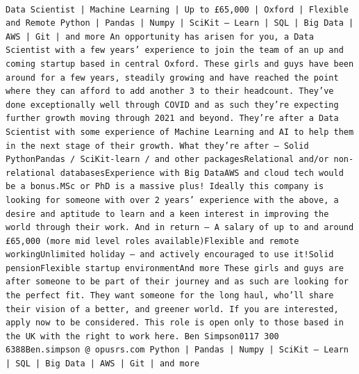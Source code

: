 \documentclass[
]{article}
\begin{document}
\begin{verbatim}
                                                                                                                                                                                                                                                                                                                                                                                                                                                                                                                                                                                            Data Scientist | Machine Learning | Up to £65,000 | Oxford | Flexible and Remote Python | Pandas | Numpy | SciKit – Learn | SQL | Big Data | AWS | Git | and more An opportunity has arisen for you, a Data Scientist with a few years’ experience to join the team of an up and coming startup based in central Oxford. These girls and guys have been around for a few years, steadily growing and have reached the point where they can afford to add another 3 to their headcount. They’ve done exceptionally well through COVID and as such they’re expecting further growth moving through 2021 and beyond. They’re after a Data Scientist with some experience of Machine Learning and AI to help them in the next stage of their growth. What they’re after – Solid PythonPandas / SciKit-learn / and other packagesRelational and/or non-relational databasesExperience with Big DataAWS and cloud tech would be a bonus.MSc or PhD is a massive plus! Ideally this company is looking for someone with over 2 years’ experience with the above, a desire and aptitude to learn and a keen interest in improving the world through their work. And in return – A salary of up to and around £65,000 (more mid level roles available)Flexible and remote workingUnlimited holiday – and actively encouraged to use it!Solid pensionFlexible startup environmentAnd more These girls and guys are after someone to be part of their journey and as such are looking for the perfect fit. They want someone for the long haul, who’ll share their vision of a better, and greener world. If you are interested, apply now to be considered. This role is open only to those based in the UK with the right to work here. Ben Simpson0117 300 6388Ben.simpson @ opusrs.com Python | Pandas | Numpy | SciKit – Learn | SQL | Big Data | AWS | Git | and more

\end{verbatim}
\end{document}
